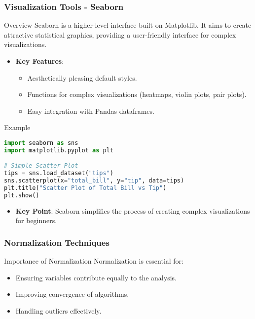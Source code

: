\documentclass[aspectratio=169]{beamer}
\begin{document}
\begin{frame}[fragile]
    \frametitle{Visualization Tools - Seaborn}
    \begin{block}{Overview}
        Seaborn is a higher-level interface built on Matplotlib. It aims to create attractive statistical graphics, providing a user-friendly interface for complex visualizations.
    \end{block}

    \begin{itemize}
        \item \textbf{Key Features}:
        \begin{itemize}
            \item Aesthetically pleasing default styles.
            \item Functions for complex visualizations (heatmaps, violin plots, pair plots).
            \item Easy integration with Pandas dataframes.
        \end{itemize}
    \end{itemize}

    \begin{block}{Example}
        \begin{lstlisting}[language=Python]
import seaborn as sns
import matplotlib.pyplot as plt

# Simple Scatter Plot
tips = sns.load_dataset("tips")
sns.scatterplot(x="total_bill", y="tip", data=tips)
plt.title("Scatter Plot of Total Bill vs Tip")
plt.show()
        \end{lstlisting}
    \end{block}

    \begin{itemize}
        \item \textbf{Key Point}: Seaborn simplifies the process of creating complex visualizations for beginners.
    \end{itemize}
\end{frame}

\begin{frame}[fragile]
    \frametitle{Normalization Techniques}
    \begin{block}{Importance of Normalization}
        Normalization is essential for:
        \begin{itemize}
            \item Ensuring variables contribute equally to the analysis.
            \item Improving convergence of algorithms.
            \item Handling outliers effectively.
        \end{itemize}
    \end{block}
\end{frame}
\end{document}
